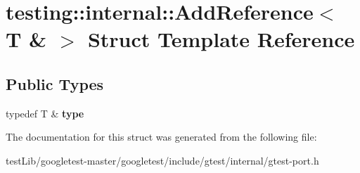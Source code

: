 \hypertarget{structtesting_1_1internal_1_1AddReference_3_01T_01_6_01_4}{}\section{testing\+:\+:internal\+:\+:Add\+Reference$<$ T \& $>$ Struct Template Reference}
\label{structtesting_1_1internal_1_1AddReference_3_01T_01_6_01_4}
\subsection*{Public Types}
\begin{DoxyCompactItemize}
\item 
\mbox{\label{structtesting_1_1internal_1_1AddReference_3_01T_01_6_01_4_a93c064cdcdaced0abd167258425e57af}} 
typedef T \& {\bfseries type}
\end{DoxyCompactItemize}


The documentation for this struct was generated from the following file\+:\begin{DoxyCompactItemize}
\item 
test\+Lib/googletest-\/master/googletest/include/gtest/internal/gtest-\/port.\+h\end{DoxyCompactItemize}
